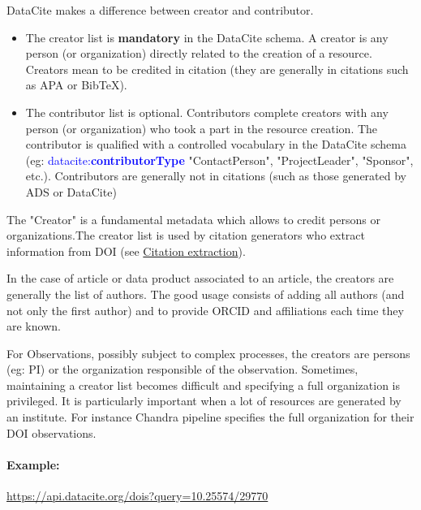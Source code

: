 \documentclass[11pt,a4paper]{ivoa}
\newcommand{\dataciteterm}[1]{\textcolor{blue}{\mbox{datacite:\textbf{#1}}}}
\begin{document}
DataCite makes a difference between creator and contributor.

\begin{itemize}
\item{} The creator list is \textbf{mandatory} in the DataCite schema. A creator is any person (or organization) directly related to the creation of a resource. Creators mean to be credited in citation (they are generally in citations such as APA or BibTeX).
\item{} The contributor list is optional. Contributors complete creators with any person (or organization) who took a part in the resource creation. The contributor is qualified with a controlled vocabulary  in the DataCite schema (eg: \dataciteterm{contributorType} "ContactPerson", "ProjectLeader", "Sponsor", etc.). Contributors are generally not in citations (such as those generated by ADS or DataCite)
\end{itemize}

The "Creator"  is a fundamental metadata which allows to credit persons or organizations.The creator list is used by citation generators who extract information from DOI (see \hyperlink{citation-extraction}{Citation extraction}).

In the case of article or data product associated to an article, the creators are generally the list of authors.  The good usage consists of adding all authors (and not only the first author) and to provide ORCID and affiliations each time they are known.

For Observations, possibly subject to complex processes, the creators are persons (eg: PI) or the organization responsible of the observation.
Sometimes, maintaining a creator list becomes difficult and specifying a full organization is privileged. It is particularly important when a lot of resources are generated by an institute. For instance Chandra pipeline specifies the full organization for their DOI observations.

\paragraph{Example:} \url{https://api.datacite.org/dois?query=10.25574/29770}\newline
\end{document}
